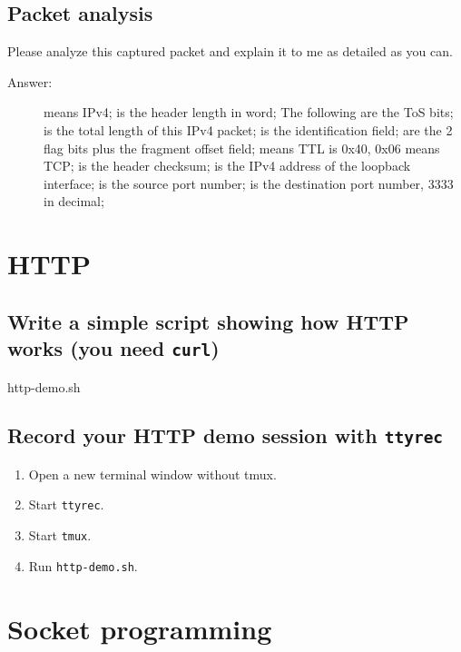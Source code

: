 \documentclass{swfulabreport}
\begin{document}
\subsection{Packet analysis}

Please analyze this captured packet and explain it to me as detailed
as you can.

\begin{description}
\item[Answer:]  means IPv4;  is the header length in
  word; The  following  are the ToS bits;
   is the total length of this IPv4 packet;  is
  the identification field;  are the 2 flag bits plus the
  fragment offset field;  means TTL is 0x40, 0x06 means
  TCP;  is the header checksum;  is the
  IPv4 address of the loopback interface;  is the source
  port number;  is the destination port number, 3333 in
  decimal;
\end{description}

\section{HTTP}

\subsection[curl, netcat, tcpdump]{Write a simple script
  showing how HTTP works (you need \texttt{curl})}

\begin{listing}
  \caption{http-demo.sh}
\end{listing}

\subsection[ttyrec]{Record your HTTP demo session with \texttt{ttyrec}}

\begin{enumerate}
\item Open a new terminal window without tmux.
\item Start \texttt{ttyrec}.
\item Start \texttt{tmux}.
\item Run \texttt{http-demo.sh}.
\end{enumerate}

\section{Socket programming}
\end{document}

